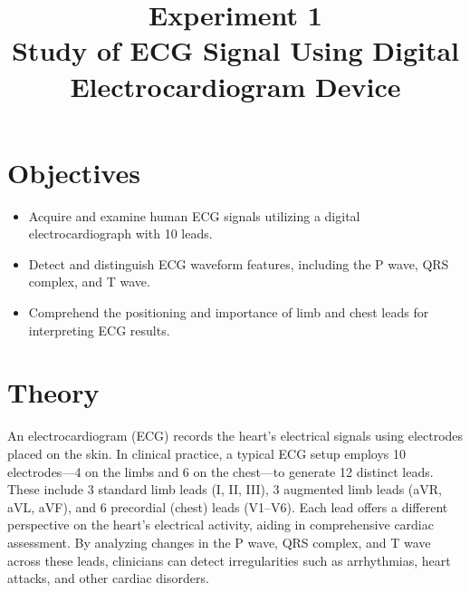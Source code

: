 \documentclass[11pt]{article}
\title{Experiment 1 \\
    \textbf{Study of ECG Signal Using Digital Electrocardiogram Device}}
\author{}
\date{}
\begin{document}


\pagebreak
\maketitle

\section*{Objectives}
\begin{itemize}
    \item Acquire and examine human ECG signals utilizing a digital electrocardiograph with 10 leads.
    \item Detect and distinguish ECG waveform features, including the P wave, QRS complex, and T wave.
    \item Comprehend the positioning and importance of limb and chest leads for interpreting ECG results.
\end{itemize}

\section*{Theory}
An electrocardiogram (ECG) records the heart’s electrical signals using electrodes placed on the skin. In clinical practice, a typical ECG setup employs 10 electrodes—4 on the limbs and 6 on the chest—to generate 12 distinct leads. These include 3 standard limb leads (I, II, III), 3 augmented limb leads (aVR, aVL, aVF), and 6 precordial (chest) leads (V1–V6). Each lead offers a different perspective on the heart’s electrical activity, aiding in comprehensive cardiac assessment. By analyzing changes in the P wave, QRS complex, and T wave across these leads, clinicians can detect irregularities such as arrhythmias, heart attacks, and other cardiac disorders.
\end{document}
